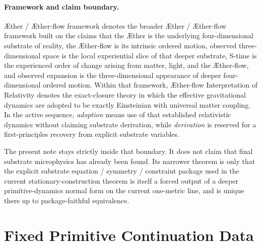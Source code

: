 \documentclass[11pt]{article}
\newcommand{\Aether}{\AE{}ther}
\newcommand{\Aflow}{\AE{}ther-flow}
\newcommand{\TheoryName}{\Aflow{} Interpretation of Relativity}
\newcommand{\TheoryProgram}{\Aether{} / \Aflow{} framework}
\begin{document}
\paragraph{Framework and claim boundary.}
\TheoryProgram{} denotes the broader \Aether{} / \Aflow{} framework built on the claims that the \Aether{} is the underlying four-dimensional substrate of reality, the \Aflow{} is its intrinsic ordered motion, observed three-dimensional space is the local experiential slice of that deeper substrate, S-time is the experienced order of change arising from matter, light, and the \Aflow{}, and observed expansion is the three-dimensional appearance of deeper four-dimensional ordered motion. Within that framework, \TheoryName{} denotes the exact-closure theory in which the effective gravitational dynamics are adopted to be exactly Einsteinian with universal matter coupling. In the active sequence, \emph{adoption} means use of that established relativistic dynamics without claiming substrate derivation, while \emph{derivation} is reserved for a first-principles recovery from explicit substrate variables.

The present note stays strictly inside that boundary. It does not claim that final substrate microphysics has already been found. Its narrower theorem is only that the explicit substrate equation / symmetry / constraint package used in the current stationary-construction theorem is itself a forced output of a deeper primitive-dynamics normal form on the current one-metric line, and is unique there up to package-faithful equivalence.

\section{Fixed Primitive Continuation Data}
\end{document}
